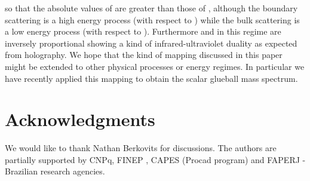 \documentclass[a4paper,twocolumn,prd,groupedaddress,nofootinbib]{revtex4}
\begin{document}
\noindent so that the absolute values of \coordHE{} are greater than those of \coordHE{},
although the boundary scattering is a high energy process
(with respect to \myHighlight{$\mu$}\coordHE{}) while the bulk scattering is a low  energy
process (with respect to \coordHE{}).
Furthermore  \coordHE{} and \coordHE{} in this regime are inversely proportional
showing a kind of infrared-ultraviolet duality as expected from  holography.
We hope that the kind of mapping discussed in this paper might 
be extended to other physical processes or energy regimes.
In particular we have recently applied this mapping to obtain the scalar 
glueball mass spectrum\cite{BB3}.


\section*{Acknowledgments}
We would like to thank Nathan Berkovits for discussions. 
The authors are partially supported by CNPq, FINEP , 
CAPES (Procad program) and FAPERJ 
- Brazilian research agencies. 

  
\end{document}
